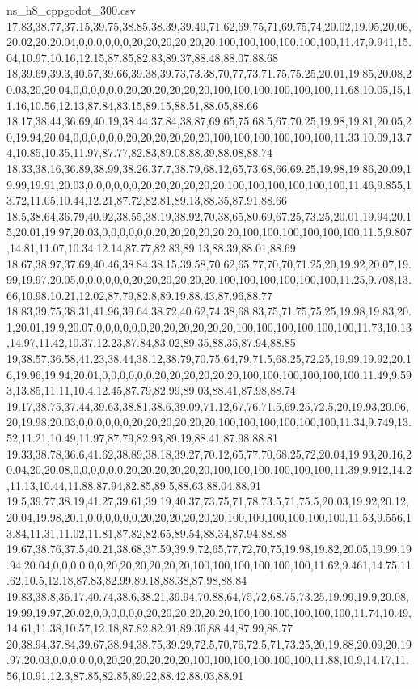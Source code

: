 \begin{filecontents*}[overwrite]{ns_h8_cppgodot_300.csv}
17.83,38.77,37.15,39.75,38.85,38.39,39.49,71.62,69,75,71,69.75,74,20.02,19.95,20.06,20.02,20,20.04,0,0,0,0,0,0,20,20,20,20,20,20,100,100,100,100,100,100,11.47,9.941,15.04,10.97,10.16,12.15,87.85,82.83,89.37,88.48,88.07,88.68
18,39.69,39.3,40.57,39.66,39.38,39.73,73.38,70,77,73,71.75,75.25,20.01,19.85,20.08,20.03,20,20.04,0,0,0,0,0,0,20,20,20,20,20,20,100,100,100,100,100,100,11.68,10.05,15,11.16,10.56,12.13,87.84,83.15,89.15,88.51,88.05,88.66
18.17,38.44,36.69,40.19,38.44,37.84,38.87,69,65,75,68.5,67,70.25,19.98,19.81,20.05,20,19.94,20.04,0,0,0,0,0,0,20,20,20,20,20,20,100,100,100,100,100,100,11.33,10.09,13.74,10.85,10.35,11.97,87.77,82.83,89.08,88.39,88.08,88.74
18.33,38.16,36.89,38.99,38.26,37.7,38.79,68.12,65,73,68,66,69.25,19.98,19.86,20.09,19.99,19.91,20.03,0,0,0,0,0,0,20,20,20,20,20,20,100,100,100,100,100,100,11.46,9.855,13.72,11.05,10.44,12.21,87.72,82.81,89.13,88.35,87.91,88.66
18.5,38.64,36.79,40.92,38.55,38.19,38.92,70.38,65,80,69,67.25,73.25,20.01,19.94,20.15,20.01,19.97,20.03,0,0,0,0,0,0,20,20,20,20,20,20,100,100,100,100,100,100,11.5,9.807,14.81,11.07,10.34,12.14,87.77,82.83,89.13,88.39,88.01,88.69
18.67,38.97,37.69,40.46,38.84,38.15,39.58,70.62,65,77,70,70,71.25,20,19.92,20.07,19.99,19.97,20.05,0,0,0,0,0,0,20,20,20,20,20,20,100,100,100,100,100,100,11.25,9.708,13.66,10.98,10.21,12.02,87.79,82.8,89.19,88.43,87.96,88.77
18.83,39.75,38.31,41.96,39.64,38.72,40.62,74.38,68,83,75,71.75,75.25,19.98,19.83,20.1,20.01,19.9,20.07,0,0,0,0,0,0,20,20,20,20,20,20,100,100,100,100,100,100,11.73,10.13,14.97,11.42,10.37,12.23,87.84,83.02,89.35,88.35,87.94,88.85
19,38.57,36.58,41.23,38.44,38.12,38.79,70.75,64,79,71.5,68.25,72.25,19.99,19.92,20.16,19.96,19.94,20.01,0,0,0,0,0,0,20,20,20,20,20,20,100,100,100,100,100,100,11.49,9.593,13.85,11.11,10.4,12.45,87.79,82.99,89.03,88.41,87.98,88.74
19.17,38.75,37.44,39.63,38.81,38.6,39.09,71.12,67,76,71.5,69.25,72.5,20,19.93,20.06,20,19.98,20.03,0,0,0,0,0,0,20,20,20,20,20,20,100,100,100,100,100,100,11.34,9.749,13.52,11.21,10.49,11.97,87.79,82.93,89.19,88.41,87.98,88.81
19.33,38.78,36.6,41.62,38.89,38.18,39.27,70.12,65,77,70,68.25,72,20.04,19.93,20.16,20.04,20,20.08,0,0,0,0,0,0,20,20,20,20,20,20,100,100,100,100,100,100,11.39,9.912,14.2,11.13,10.44,11.88,87.94,82.85,89.5,88.63,88.04,88.91
19.5,39.77,38.19,41.27,39.61,39.19,40.37,73.75,71,78,73.5,71,75.5,20.03,19.92,20.12,20.04,19.98,20.1,0,0,0,0,0,0,20,20,20,20,20,20,100,100,100,100,100,100,11.53,9.556,13.84,11.31,11.02,11.81,87.82,82.65,89.54,88.34,87.94,88.88
19.67,38.76,37.5,40.21,38.68,37.59,39.9,72,65,77,72,70,75,19.98,19.82,20.05,19.99,19.94,20.04,0,0,0,0,0,0,20,20,20,20,20,20,100,100,100,100,100,100,11.62,9.461,14.75,11.62,10.5,12.18,87.83,82.99,89.18,88.38,87.98,88.84
19.83,38.8,36.17,40.74,38.6,38.21,39.94,70.88,64,75,72,68.75,73.25,19.99,19.9,20.08,19.99,19.97,20.02,0,0,0,0,0,0,20,20,20,20,20,20,100,100,100,100,100,100,11.74,10.49,14.61,11.38,10.57,12.18,87.82,82.91,89.36,88.44,87.99,88.77
20,38.94,37.84,39.67,38.94,38.75,39.29,72.5,70,76,72.5,71,73.25,20,19.88,20.09,20,19.97,20.03,0,0,0,0,0,0,20,20,20,20,20,20,100,100,100,100,100,100,11.88,10.9,14.17,11.56,10.91,12.3,87.85,82.85,89.22,88.42,88.03,88.91
\end{filecontents*}

